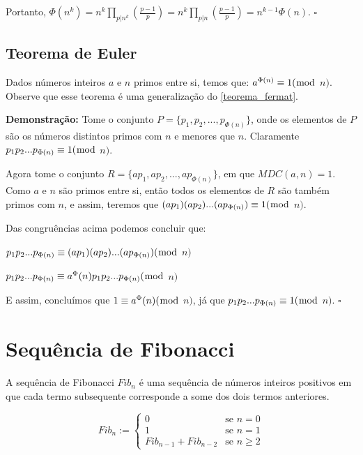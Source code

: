 Portanto, $\Phi(n^k) = n^k \prod_{p|n^k}(\frac{p-1}{p}) = n^k \prod_{p|n}(\frac{p-1}{p}) = n^{k-1}\Phi(n)$. $\square$


\subsection{Teorema de Euler}

\begin{theorem}\label{teorema_de_euler}
Dados números inteiros $a$ e $n$ primos entre si, temos que:
$a^{\Phi(n)} \equiv 1 (\bmod$ $n)$. Observe que esse teorema é uma generalização do \autoref{teorema_fermat}.
\end{theorem}
\textbf{Demonstração:}
Tome o conjunto $P = \{p_1, p_2, ..., p_{\Phi(n)}\}$, onde os elementos de $P$ são os números distintos primos com $n$ e menores que $n$. Claramente $p_1p_2...p_{\Phi(n)} \equiv 1(\bmod$ $n)$.

Agora tome o conjunto $R = \{ap_1, ap_2, ..., ap_{\Phi(n)}\}$, em que $MDC(a,n) = 1$. Como $a$ e $n$ são primos entre si, então todos
os elementos de $R$ são também primos com $n$, e assim, teremos que $(ap_1)(ap_2)...(ap_{\Phi(n)}) \equiv 1(\bmod$ $n)$.

Das congruências acima podemos concluir que:
\newline

$p_1p_2...p_{\Phi(n)} \equiv  (ap_1)(ap_2)...(ap_{\Phi(n)}) (\bmod$ $n)$ 

$p_1p_2...p_{\Phi(n)} \equiv a^\Phi(n)p_1p_2...p_{\Phi(n)} (\bmod$ $n)$
\newline

E assim, concluímos que $1 \equiv a^\Phi(n)(\bmod$ $n)$, já que $p_1p_2...p_{\Phi(n)} \equiv 1(\bmod$ $n)$. $\square$
\\

\section{Sequência de Fibonacci}

\begin{definition}
A sequência de Fibonacci $Fib_n$ é uma sequência de números inteiros positivos em que cada termo subsequente corresponde a some dos dois termos anteriores.

\[
 Fib_n :=
  \begin{cases}
   0 & \text{se } n = 0 \\
   1 & \text{se } n = 1 \\
   Fib_{n-1} + Fib_{n-2} & \text{se } n \geq 2
  \end{cases}
\]
\end{definition}


